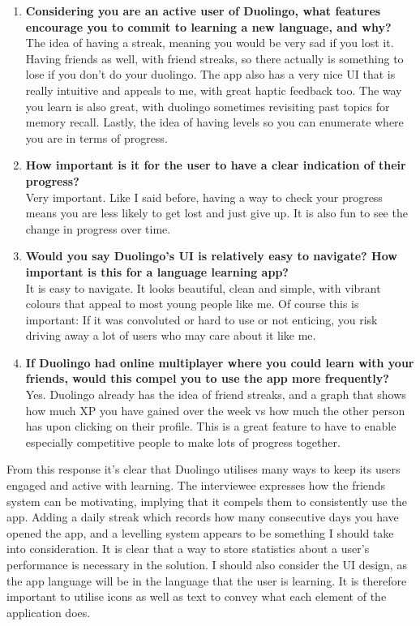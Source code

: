 \documentclass{article}
\begin{document}
\begin{enumerate}
    \item \textbf{Considering you are an active user of Duolingo, what features encourage you to commit to learning a new language, and why?} \\ The idea of having a streak, meaning you would be very sad if you lost it. Having friends as well, with friend streaks, so there actually is something to lose if you don't do your duolingo. The app also has a very nice UI that is really intuitive and appeals to me, with great haptic feedback too. The way you learn is also great, with duolingo sometimes revisiting past topics for memory recall. Lastly, the idea of having levels so you can enumerate where you are in terms of progress.
    \item \textbf{How important is it for the user to have a clear indication of their progress?} \\ Very important. Like I said before, having a way to check your progress means you are less likely to get lost and just give up. It is also fun to see the change in progress over time.
    \item \textbf{Would you say Duolingo's UI is relatively easy to navigate? How important is this for a language learning app?} \\ It is easy to navigate. It looks beautiful, clean and simple, with vibrant colours that appeal to most young people like me. Of course this is important: If it was convoluted or hard to use or not enticing, you risk driving away a lot of users who may care about it like me.
    \item \textbf{If Duolingo had online multiplayer where you could learn with your friends, would this compel you to use the app more frequently?} \\ Yes. Duolingo already has the idea of friend streaks, and a graph that shows how much XP you have gained over the week vs how much the other person has upon clicking on their profile. This is a great feature to have to enable especially competitive people to make lots of progress together.
\end{enumerate}

From this response it's clear that Duolingo utilises many ways to keep its users engaged and active with learning. The interviewee expresses how the friends system can be motivating, implying that it compels them to consistently use the app. Adding a daily streak which records how many consecutive days you have opened the app, and a levelling system appears to be something I should take into consideration. It is clear that a way to store statistics about a user's performance is necessary in the solution. I should also consider the UI design, as the app language will be in the language that the user is learning. It is therefore important to utilise icons as well as text to convey what each element of the application does.
\end{document}
